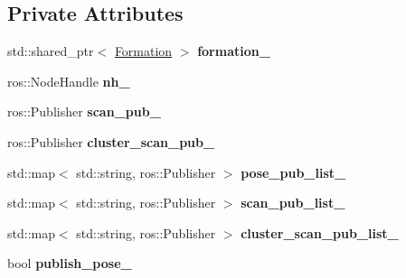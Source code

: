 \subsection*{Private Attributes}
\begin{DoxyCompactItemize}
\item 
std\+::shared\+\_\+ptr$<$ \hyperlink{classFormation}{Formation} $>$ {\bfseries formation\+\_\+}\hypertarget{classFormationPublisher_afde74a05d76fab172a5fe082b3c2a29f}{}\label{classFormationPublisher_afde74a05d76fab172a5fe082b3c2a29f}

\item 
ros\+::\+Node\+Handle {\bfseries nh\+\_\+}\hypertarget{classFormationPublisher_a313cced4558ac58574ae4035d0021211}{}\label{classFormationPublisher_a313cced4558ac58574ae4035d0021211}

\item 
ros\+::\+Publisher {\bfseries scan\+\_\+pub\+\_\+}\hypertarget{classFormationPublisher_aeeb45b5bfefbec155b6f54c935de1526}{}\label{classFormationPublisher_aeeb45b5bfefbec155b6f54c935de1526}

\item 
ros\+::\+Publisher {\bfseries cluster\+\_\+scan\+\_\+pub\+\_\+}\hypertarget{classFormationPublisher_ac55c81247dd40c31c91ac9b64c106b2d}{}\label{classFormationPublisher_ac55c81247dd40c31c91ac9b64c106b2d}

\item 
std\+::map$<$ std\+::string, ros\+::\+Publisher $>$ {\bfseries pose\+\_\+pub\+\_\+list\+\_\+}\hypertarget{classFormationPublisher_a160136dc8ed728bc79c9c381cb75cfbc}{}\label{classFormationPublisher_a160136dc8ed728bc79c9c381cb75cfbc}

\item 
std\+::map$<$ std\+::string, ros\+::\+Publisher $>$ {\bfseries scan\+\_\+pub\+\_\+list\+\_\+}\hypertarget{classFormationPublisher_ace72a0374b23fb91205368981d997adb}{}\label{classFormationPublisher_ace72a0374b23fb91205368981d997adb}

\item 
std\+::map$<$ std\+::string, ros\+::\+Publisher $>$ {\bfseries cluster\+\_\+scan\+\_\+pub\+\_\+list\+\_\+}\hypertarget{classFormationPublisher_aaa63016387f2b55740539d0925ce4b28}{}\label{classFormationPublisher_aaa63016387f2b55740539d0925ce4b28}

\item 
bool {\bfseries publish\+\_\+pose\+\_\+}\hypertarget{classFormationPublisher_a171f25755f77eb6e260fc710d5436bbf}{}\label{classFormationPublisher_a171f25755f77eb6e260fc710d5436bbf}


\end{DoxyCompactItemize}
